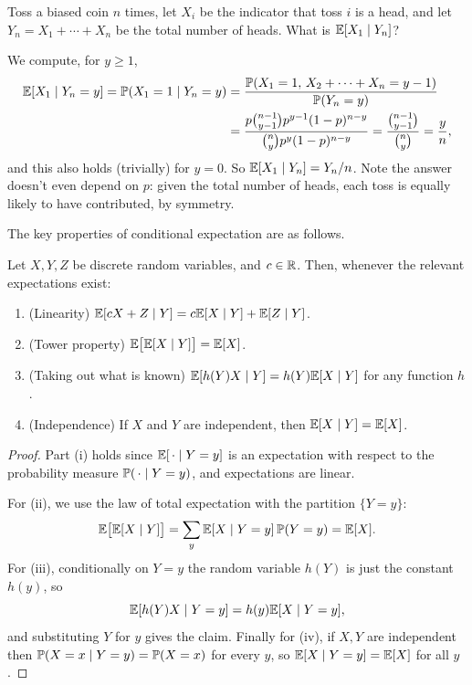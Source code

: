\documentclass[a4paper]{scrartcl}
\begin{document}
\begin{example}
	Toss a biased coin $n$ times, let $X_i$ be the indicator that toss $i$ is a head, and let $Y_n = X_1 + \cdots + X_n$ be the total number of heads. What is $\mathbb{E}[X_1 \mid Y_n]$?

	We compute, for $y \geq 1$,
	\begin{align*}
		\mathbb{E}[X_1 \mid Y_n = y] = \mathbb{P}(X_1 = 1 \mid Y_n = y) &= \frac{\mathbb{P}(X_1 = 1, \, X_2 + \cdots + X_n = y - 1)}{\mathbb{P}(Y_n = y)} \\
		&= \frac{p\binom{n - 1}{y - 1}p^{y-1}(1-p)^{n - y}}{\binom{n}{y}p^y(1-p)^{n-y}} = \frac{\binom{n-1}{y-1}}{\binom{n}{y}} = \frac{y}{n},
	\end{align*}
	and this also holds (trivially) for $y = 0$. So $\mathbb{E}[X_1 \mid Y_n] = Y_n / n$. Note the answer doesn't even depend on $p$: given the total number of heads, each toss is equally likely to have contributed, by symmetry.
\end{example}

The key properties of conditional expectation are as follows.

\begin{proposition}
	Let $X, Y, Z$ be discrete random variables, and $c \in \mathbb{R}$. Then, whenever the relevant expectations exist:
	\begin{enumerate}[label=(\roman*)]
		\item (Linearity) $\mathbb{E}[cX + Z \mid Y] = c\mathbb{E}[X \mid Y] + \mathbb{E}[Z \mid Y]$.
		\item (Tower property) $\mathbb{E}\big[\mathbb{E}[X \mid Y]\big] = \mathbb{E}[X]$.
		\item (Taking out what is known) $\mathbb{E}[h(Y) X \mid Y] = h(Y) \mathbb{E}[X \mid Y]$ for any function $h$.
		\item (Independence) If $X$ and $Y$ are independent, then $\mathbb{E}[X \mid Y] = \mathbb{E}[X]$.
	\end{enumerate}
\end{proposition}
\begin{proof}
	Part (i) holds since $\mathbb{E}[\,\cdot \mid Y = y]$ is an expectation with respect to the probability measure $\mathbb{P}(\,\cdot \mid Y = y)$, and expectations are linear.

	For (ii), we use the law of total expectation with the partition $\{Y = y\}$:
	$$
	\mathbb{E}\big[\mathbb{E}[X \mid Y]\big] = \sum_y \mathbb{E}[X \mid Y = y] \, \mathbb{P}(Y = y) = \mathbb{E}[X].
	$$
	For (iii), conditionally on $Y = y$ the random variable $h(Y)$ is just the constant $h(y)$, so
	$$
	\mathbb{E}[h(Y)X \mid Y = y] = h(y)\mathbb{E}[X \mid Y = y],
	$$
	and substituting $Y$ for $y$ gives the claim. Finally for (iv), if $X, Y$ are independent then $\mathbb{P}(X = x \mid Y = y) = \mathbb{P}(X = x)$ for every $y$, so $\mathbb{E}[X \mid Y = y] = \mathbb{E}[X]$ for all $y$.
\end{proof}
\end{document}
